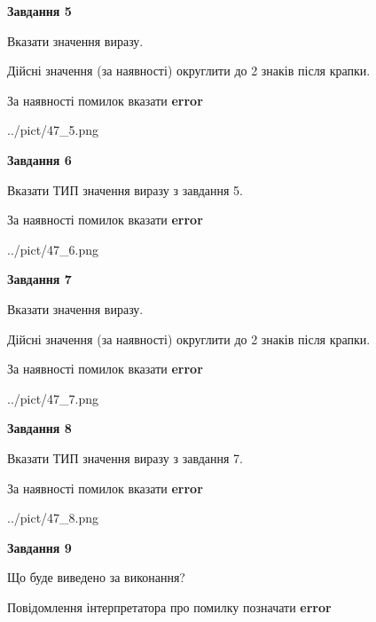 \documentclass[11pt, ukrainian]{article}
\begin{document}
{\begin {large}
{\begin {center}\textbf{Завдання 5}\end {center}}\par
Вказати значення виразу. \par
Дійсні значення (за наявності) округлити до 2 знаків після крапки. \par
За наявності помилок вказати \textbf{error}

\begin{center}
	{../pict/47_5.png}
\end{center}
\newpage

{\begin {center}\textbf{Завдання 6}\end {center}}\par
Вказати ТИП значення виразу з завдання 5. \par
За наявності помилок вказати \textbf{error}

\begin{center}
	{../pict/47_6.png}
\end{center}
\newpage

{\begin {center}\textbf{Завдання 7}\end {center}}\par
Вказати значення виразу. \par
Дійсні значення (за наявності) округлити до 2 знаків після крапки. \par
За наявності помилок вказати \textbf{error}

\begin{center}
	{../pict/47_7.png}
\end{center}
\newpage

{\begin {center}\textbf{Завдання 8}\end {center}}\par
Вказати ТИП значення виразу з завдання 7. \par
За наявності помилок вказати \textbf{error}

\begin{center}
	{../pict/47_8.png}
\end{center}
\newpage

{\begin {center}\textbf{Завдання 9}\end {center}}\par
Що буде виведено за виконання? \par
Повідомлення інтерпретатора про помилку позначати \textbf{error}


\end{large}}
\end{document}

